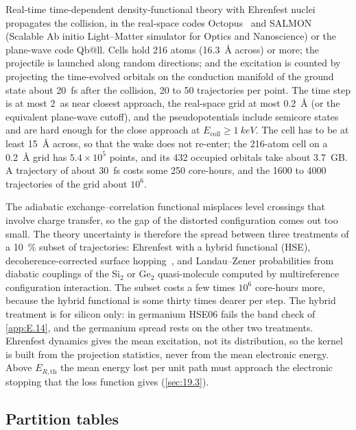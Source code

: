 Real-time time-dependent density-functional theory with Ehrenfest nuclei propagates the collision, in the real-space codes Octopus~\cite{tancogne2020octopus} and SALMON (Scalable Ab initio Light--Matter simulator for Optics and Nanoscience) or the plane-wave code Qb@ll. Cells hold 216 atoms (\SI{16.3}{\angstrom} across) or more; the projectile is launched along random directions; and the excitation is counted by projecting the time-evolved orbitals on the conduction manifold of the ground state about \SI{20}{fs} after the collision, 20 to 50 trajectories per point. The time step is at most \SI{2}{as} near closest approach, the real-space grid at most \SI{0.2}{\angstrom} (or the equivalent plane-wave cutoff), and the pseudopotentials include semicore states and are hard enough for the close approach at $E_{\mathrm{coll}} \ge \SI{1}{keV}$. The cell has to be at least \SI{15}{\angstrom} across, so that the wake does not re-enter; the 216-atom cell on a \SI{0.2}{\angstrom} grid has $5.4\times10^5$ points, and its 432 occupied orbitals take about \SI{3.7}{GB}. A trajectory of about \SI{30}{fs} costs some 250 core-hours, and the 1600 to 4000 trajectories of the grid about $10^6$.

The adiabatic exchange--correlation functional misplaces level crossings that involve charge transfer, so the gap of the distorted configuration comes out too small. The theory uncertainty is therefore the spread between three treatments of a \SI{10}{\percent} subset of trajectories: Ehrenfest with a hybrid functional (HSE), decoherence-corrected surface hopping~\cite{tully1990molecular}, and Landau--Zener probabilities from diabatic couplings of the Si$_2$ or Ge$_2$ quasi-molecule computed by multireference configuration interaction. The subset costs a few times $10^6$ core-hours more, because the hybrid functional is some thirty times dearer per step. The hybrid treatment is for silicon only: in germanium HSE06 fails the band check of \cref{app:E.14}, and the germanium spread rests on the other two treatments. Ehrenfest dynamics gives the mean excitation, not its distribution, so the kernel is built from the projection statistics, never from the mean electronic energy. Above $E_{R,\mathrm{th}}$ the mean energy lost per unit path must approach the electronic stopping that the loss function gives (\cref{sec:19.3}).

\subsection{Partition tables}

